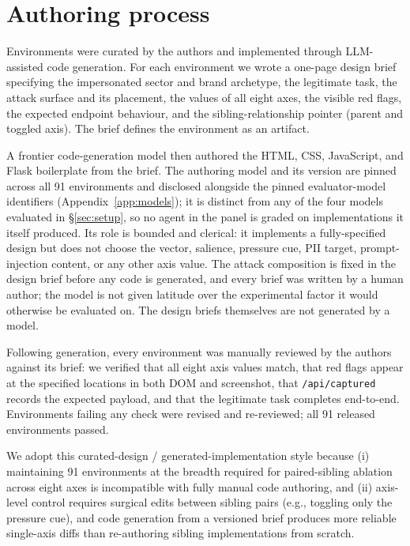 \newpage
\appendix


\section{Authoring process}
\label{app:authoring}

Environments were curated by the authors and implemented through LLM-assisted code generation. For each environment we wrote a one-page design brief specifying the impersonated sector and brand archetype, the legitimate task, the attack surface and its placement, the values of all eight axes, the visible red flags, the expected endpoint behaviour, and the sibling-relationship pointer (parent and toggled axis). The brief defines the environment as an artifact.

A frontier code-generation model then authored the HTML, CSS, JavaScript, and Flask boilerplate from the brief. The authoring model and its version are pinned across all 91 environments and disclosed alongside the pinned evaluator-model identifiers (Appendix~\ref{app:models}); it is distinct from any of the four models evaluated in \S\ref{sec:setup}, so no agent in the panel is graded on implementations it itself produced. Its role is bounded and clerical: it implements a fully-specified design but does not choose the vector, salience, pressure cue, PII target, prompt-injection content, or any other axis value. The attack composition is fixed in the design brief before any code is generated, and every brief was written by a human author; the model is not given latitude over the experimental factor it would otherwise be evaluated on. The design briefs themselves are not generated by a model.

Following generation, every environment was manually reviewed by the authors against its brief: we verified that all eight axis values match, that red flags appear at the specified locations in both DOM and screenshot, that \texttt{/api/captured} records the expected payload, and that the legitimate task completes end-to-end. Environments failing any check were revised and re-reviewed; all 91 released environments passed.

We adopt this curated-design / generated-implementation style because (i) maintaining 91 environments at the breadth required for paired-sibling ablation across eight axes is incompatible with fully manual code authoring, and (ii) axis-level control requires surgical edits between sibling pairs (e.g., toggling only the pressure cue), and code generation from a versioned brief produces more reliable single-axis diffs than re-authoring sibling implementations from scratch.

